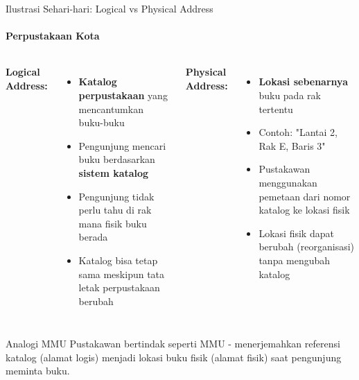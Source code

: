 \documentclass[10pt,aspectratio=169]{beamer}
\begin{document}
\begin{frame}{Ilustrasi Sehari-hari: Logical vs Physical Address}
    \framesubtitle{Perpustakaan Kota}
    
    \begin{columns}[T]
            \textbf{Logical Address:}
            \begin{itemize}
                \item \textbf{Katalog perpustakaan} yang mencantumkan buku-buku
                \item Pengunjung mencari buku berdasarkan \textbf{sistem katalog}
                \item Pengunjung tidak perlu tahu di rak mana fisik buku berada
                \item Katalog bisa tetap sama meskipun tata letak perpustakaan berubah
            \end{itemize}
            
            \textbf{Physical Address:}
            \begin{itemize}
                \item \textbf{Lokasi sebenarnya} buku pada rak tertentu
                \item Contoh: "Lantai 2, Rak E, Baris 3"
                \item Pustakawan menggunakan pemetaan dari nomor katalog ke lokasi fisik
                \item Lokasi fisik dapat berubah (reorganisasi) tanpa mengubah katalog
            \end{itemize}
    \end{columns}
    
    \vspace{0.3cm}
    \begin{alertblock}{Analogi MMU}
        Pustakawan bertindak seperti MMU - menerjemahkan referensi katalog (alamat logis) menjadi lokasi buku fisik (alamat fisik) saat pengunjung meminta buku.
    \end{alertblock}
\end{frame}
\end{document}
